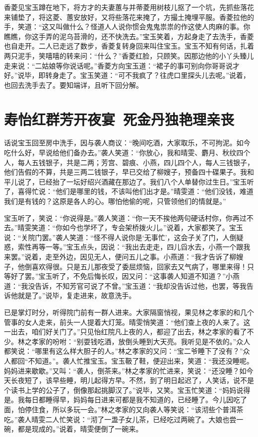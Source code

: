 \documentclass[12pt,oneside]{book}
\begin{document}
香菱见宝玉蹲在地下，将方才的夫妻蕙与并蒂菱用树枝儿抠了一个坑，先抓些落花来铺垫了，将这菱、蕙安放好，又将些落花来掩了，方撮土掩埋平服。香菱拉他的手，笑道：“这又叫做什么？怪道人人说你惯会鬼鬼祟祟的作这使人肉麻的事。你瞧瞧，你这手弄的泥乌苔滑的，还不快洗去。”宝玉笑着，方起身走了去洗手，香菱也自走开。二人已走远了数步，香菱复转身回来叫住宝玉。宝玉不知有何话，扎着两只泥手，笑嘻嘻的转来问：“什么？”香菱红脸，只顾笑。因那边他的小丫头臻儿走来说：“二姑娘等你说话呢。”香菱方向宝玉道：“裙子的事可别向你哥哥说才好。”说毕，即转身走了。宝玉笑道：“可不我疯了？往虎口里探头儿去呢。”说着，也回去洗手去了。要知端详，且听下回分解。

 
\chapter{寿怡红群芳开夜宴~死金丹独艳理亲丧}
话说宝玉回至房中洗手，因与袭人商议：“晚间吃酒，大家取乐，不可拘泥。如今吃什么好，早说给他们备办去。”袭人笑道：“你放心，我和晴雯、麝月、秋纹四个人，每人五钱银子，共是二两；芳宫、碧痕、小燕，四儿四个人，每人三钱银子，他们告假的不算，共是三两二钱银子，早已交给了柳嫂子，预备四十碟果子。我和平儿说了，已经抬了一坛好绍兴酒藏在那边了。我们八个人单替你过生日。”宝玉听了，喜得忙说：“他们是哪里的钱，不该叫他们出才是。”晴雯道：“他们没钱，难道我们是有钱的？这原是各人的心。哪怕他偷的呢，只管领他们的情就是。”

宝玉听了，笑说：“你说得是。”袭人笑道：“你一天不挨他两句硬话村你，你再过不去。”晴雯笑道：“你如今也学坏了，专会架桥拨火儿。”说着，大家都笑了。宝玉说：“关院门罢。”袭人笑道：“怪不得人说你是‘无事忙’，这会子关了门，人倒疑惑，索性再等一等。”宝玉点头，因说：“我出去走走，四儿舀水去，小燕一个跟我来罢。”说着，走至外边，因见无人，便问五儿之事。小燕道：“我才告诉了柳嫂子，他倒喜欢得很。只是五儿那夜受了委屈烦恼，回家去又气病了，哪里来得！只等好了罢。”宝玉听了，不免后悔长叹，因又问：“这事袭人知道不知道？”小燕道：“我没告诉，不知芳官可说了不曾。”宝玉道：“我却没告诉过他，也罢，等我告诉他就是了。”说毕，复走进来，故意洗手。

已是掌灯时分，听得院门前有一群人进来。大家隔窗悄视，果见林之孝家的和几个管事的女人走来，前头一人提着大灯笼。晴雯悄笑道：“他们查上夜的人来了。这一出去，咱们好关门了。”只见怡红院凡上夜的人，都迎了出去，林之孝家的看了不少。林之孝家的吩咐：“别耍钱吃酒，放倒头睡到大天亮。我听见是不依的。”众人都笑说：“哪里有这么样大胆子的人。”林之孝家的又问：“宝二爷睡下了没有？”众人都回“不知道。”。袭人忙推宝玉。宝玉靸了鞋，便迎出来，笑道：“我还没睡呢。妈妈进来歇歇。”又叫：“袭人，倒茶来。”林之孝家的忙进来，笑说：“还没睡？如今天长夜短了，该早些睡，明儿起得方早。不然，到了明日起迟了，人笑话，说不是个读书上学的公子了，倒像那起挑脚汉了。”说毕，又笑。宝玉忙笑道：“妈妈说得是。我每日都睡得早，妈妈每日进来可都是我不知道的，已经睡了。今儿因吃了面，怕停住食，所以多玩一会。”林之孝家的又向袭人等笑说：“该沏些个普洱茶吃。”袭人晴雯二人忙笑说：“沏了一盄子女儿茶，已经吃过两碗了。大娘也尝一碗，都是现成的。”说着，晴雯便倒了一碗来。
\end{document}
